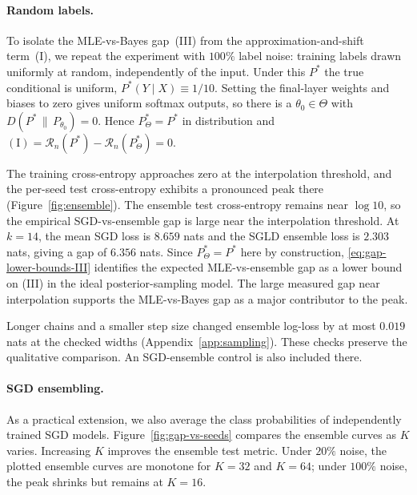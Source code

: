 \paragraph{Random labels.}
To isolate the MLE-vs-Bayes gap~(III) from the approximation-and-shift
term~(I), we repeat the experiment with $100\%$ label noise: training labels
drawn uniformly at random, independently of the input. Under this $P^*$ the
true conditional is uniform, $P^*(Y\mid X)\equiv 1/10$. Setting the final-layer weights and biases to zero gives uniform
softmax outputs, so there is a $\theta_0\in\Theta$ with
$D(P^*\,\|\,P_{\theta_0})=0$. Hence
$P^*_\Theta=P^*$ in distribution and
$(\mathrm{I})=\mathcal{R}_n(P^*)-\mathcal{R}_n(P^*_\Theta)=0$.

The training cross-entropy approaches zero at the interpolation threshold, and
the per-seed test cross-entropy exhibits a pronounced peak there
(Figure~\ref{fig:ensemble}). The ensemble test cross-entropy remains near
$\log 10$, so the empirical SGD-vs-ensemble gap is large near the
interpolation threshold. At $k=14$, the mean SGD loss is $8.659$ nats and
the SGLD ensemble loss is $2.303$ nats, giving a gap of $6.356$ nats.
Since $P^*_\Theta=P^*$ here by construction,
\eqref{eq:gap-lower-bounds-III} identifies the expected MLE-vs-ensemble gap
as a lower bound on (III) in the ideal posterior-sampling model.
The large measured gap near interpolation supports the MLE-vs-Bayes gap
as a major contributor to the peak.

Longer chains and a smaller step size changed ensemble log-loss by at most
$0.019$ nats at the checked widths (Appendix~\ref{app:sampling}).
These checks preserve the qualitative comparison. An SGD-ensemble
control is also included there.

\paragraph{SGD ensembling.}
As a practical extension, we also average the class probabilities of
independently trained SGD models.
Figure~\ref{fig:gap-vs-seeds} compares the ensemble curves as $K$ varies.
Increasing $K$ improves the ensemble test metric. Under $20\%$ noise,
the plotted ensemble curves are monotone for $K=32$ and $K=64$; under
$100\%$ noise, the peak shrinks but remains at $K=16$.

